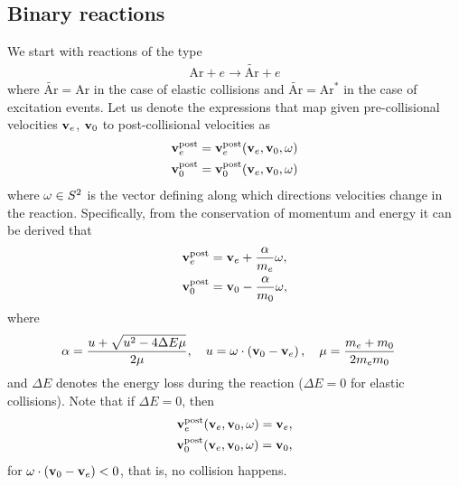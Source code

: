 \documentclass{article}
\begin{document}
\subsection{Binary reactions}
We start with reactions of the type
\begin{align*}
\text{Ar} + e \longrightarrow \tilde{\text{Ar}} + e
\end{align*}
where $\tilde{\text{Ar}} = \text{Ar}$ in the case of elastic collisions and $\tilde{\text{Ar}} = \text{Ar}^\ast$ in the case of excitation events. Let us denote the expressions that map given pre-collisional velocities $\mathbf{v}_e$, $\mathbf{v}_0$ to post-collisional velocities as 
\begin{align*}
\vect{v}_e^\text{post} &= \vect{v}_e^\text{post} \of{\vect{v}_e, \vect{v}_0, \vect{\omega}}
\\
\vect{v}_0^\text{post} &= \vect{v}_0^\text{post} \of{\vect{v}_e, \vect{v}_0, \vect{\omega}}
\end{align*} 
where $\mathbf{\omega} \in S^2$ is the vector defining along which directions velocities change in the reaction. Specifically, from the conservation of momentum and energy it can be derived that
\begin{align*}
\mathbf{v}_e^\text{post} &= \mathbf{v}_e + \frac{\alpha}{m_e}\mathbf{\omega},
\\
\mathbf{v}_0^\text{post} &= \mathbf{v}_0 - \frac{\alpha}{m_0}\mathbf{\omega},
\end{align*}
where
\begin{align*}
\alpha &= \frac{u + \sqrt{u^2 - 4 \Delta E \mu}}{2\mu},
\quad 
u = \mathbf{\omega} \cdot \left( \mathbf{v}_0 - \mathbf{v}_e \right),
\quad 
\mu = \frac{m_e+m_0}{2 m_e m_0}
\end{align*}
and $\Delta E$ denotes the energy loss during the reaction ($\Delta E = 0$ for elastic collisions). Note that if $\Delta E=0$, then
\begin{align*}
\vect{v}_e^\text{post} \of{\vect{v}_e, \vect{v}_0, \vect{\omega}} = \vect{v}_e,
\\
\vect{v}_0^\text{post} \of{\vect{v}_e, \vect{v}_0, \vect{\omega}} = \vect{v}_0,
\end{align*} 
for $\mathbf{\omega} \cdot \left( \mathbf{v}_0 - \mathbf{v}_e \right) < 0$, that is, no collision happens.
\end{document}
